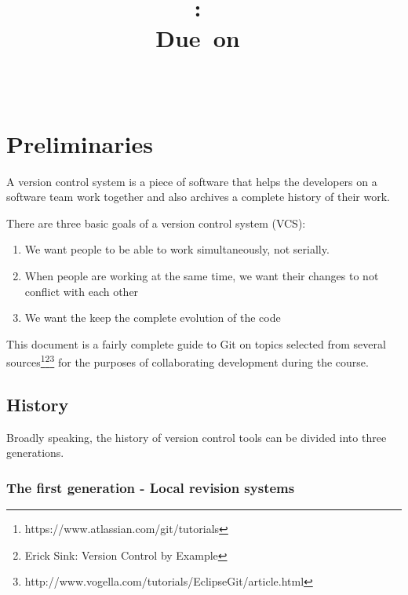 \documentclass{article}
\title{
\vspace{2in}
\textmd{\textbf{\hmwkClass:\ \hmwkTitle}}\\
\normalsize\vspace{0.1in}\small{Due\ on\ \hmwkDueDate}\\
\vspace{0.1in}\large{\textit{\hmwkClassInstructor\ \hmwkClassTime}}
\vspace{3in}
}
\author{\textbf{\hmwkAuthorName}}
\date{} %
\begin{document}
\maketitle



\newpage
\tableofcontents
\newpage




 \section{Preliminaries}

A version control system is a piece of software that helps the
developers on a software team work together and also archives a
complete history of their work.

There are three basic goals of a version control system (VCS):

\begin{enumerate}
\item We want people to be able to work simultaneously, not serially.
\item When people are working at the same time, we want their changes
  to not conflict with each other
\item We want the keep the complete evolution of the code
\end{enumerate}

This document is a fairly complete guide to Git on topics selected
from several
sources\footnote{https://www.atlassian.com/git/tutorials}\footnote{Erick
  Sink: Version Control by
  Example}\footnote{http://www.vogella.com/tutorials/EclipseGit/article.html}
for the purposes of collaborating development during the course.

\subsection*{History}
Broadly speaking, the history of version control tools can be divided
into three generations.

\subsubsection*{The first generation - Local revision systems}
\end{document}
